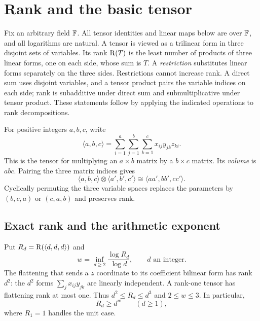 \section{Rank and the basic tensor}\label{sec:foundations}

Fix an arbitrary field $\mathbb F$.  All tensor identities and linear maps below
are over $\mathbb F$, and all logarithms are natural.  A tensor is viewed as a
trilinear form in three disjoint
sets of variables.  Its rank $\operatorname{R}(T)$ is the least number of products of
three linear forms, one on each side, whose sum is $T$.  A
\emph{restriction} substitutes linear forms separately on the three
sides.  Restrictions cannot increase rank.  A direct sum uses disjoint
variables, and a tensor product pairs the variable indices on each side;
rank is subadditive under direct sum and submultiplicative under tensor
product.  These statements follow by applying the indicated operations
to rank decompositions.

For positive integers $a,b,c$, write
\[
 \langle a,b,c\rangle
   =\sum_{i=1}^{a}\sum_{j=1}^{b}\sum_{k=1}^{c}
       x_{ij}y_{jk}z_{ki}.
\]
This is the tensor for multiplying an $a\times b$ matrix by a
$b\times c$ matrix.  Its \emph{volume} is $abc$.  Pairing the three
matrix indices gives
\[
 \langle a,b,c\rangle\otimes\langle a',b',c'\rangle
     \cong\langle aa',bb',cc'\rangle.
\]
Cyclically permuting the three variable spaces replaces the parameters
by $(b,c,a)$ or $(c,a,b)$ and preserves rank.

\subsection{Exact rank and the arithmetic exponent}

Put $R_d=\operatorname{R}(\langle d,d,d\rangle)$ and
\begin{equation}\label{eq:rank-exponent}
 w=\inf_{d\geq2}\frac{\log R_d}{\log d},
 \qquad d\text{ an integer}.
\end{equation}
The flattening that sends a $z$ coordinate to its coefficient bilinear
form has rank $d^2$: the $d^2$ forms
$\sum_jx_{ij}y_{jk}$ are linearly independent.  A rank-one tensor has
flattening rank at most one.  Thus
$d^2\leq R_d\leq d^3$ and $2\leq w\leq3$.  In particular,
\begin{equation}\label{eq:square-rank-lower}
 R_d\geq d^w\qquad(d\geq1),
\end{equation}
where $R_1=1$ handles the unit case.


